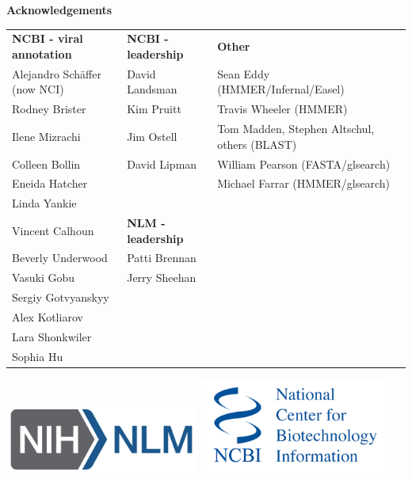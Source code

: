 \documentclass[landscape]{slides}
\begin{document}
\begin{slide}

\large
\begin{center}
\large{\textbf{Acknowledgements}} \\

\normalsize
\vspace{0.75in}

\small
\begin{tabular}{l|l|l}
\textbf{NCBI - viral annotation} & \textbf{NCBI - leadership} &  \textbf{Other} \\
Alejandro Sch\"{a}ffer (now NCI) & David Landsman             & Sean Eddy (HMMER/Infernal/Easel)\\
Rodney Brister                   & Kim Pruitt                 & Travis Wheeler (HMMER)\\
Ilene Mizrachi                   & Jim Ostell                 & Tom Madden, Stephen Altschul, others (BLAST)\\
Colleen Bollin                   & David Lipman               & William Pearson (FASTA/glsearch) \\
Eneida Hatcher                   &                            & Michael Farrar (HMMER/glsearch) \\
Linda Yankie                     &                            & \\
Vincent Calhoun                  & \textbf{NLM - leadership}  & \\
Beverly Underwood                & Patti Brennan              & \\
Vasuki Gobu                      & Jerry Sheehan              &  \\
Sergiy Gotvyanskyy               &                            & \\
Alex Kotliarov                   &                            & \\
Lara Shonkwiler                  & & \\
Sophia Hu                        & & \\
\end{tabular}

\includegraphics[width=2.5in]{figs/NIH_NLM_ABRV_2C_4-white}
\includegraphics[width=2.5in]{figs/ncbi-logo}

\end{center}

\vfill
\end{slide}
\end{document}
